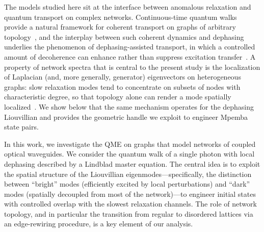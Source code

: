 \documentclass[pdflatex,sn-mathphys-num]{sn-jnl}
\let\origtextcolor\textcolor
\newcommand{\rev}[1]{{\origtextcolor{revred}{#1}}}
\renewcommand{\textcolor}[2]{#2}
\begin{document}
\rev{The models studied here sit at the interface between anomalous relaxation and quantum transport on complex networks. Continuous-time quantum walks provide a natural framework for coherent transport on graphs of arbitrary topology~\cite{Mulken2011}, and the interplay between such coherent dynamics and dephasing underlies the phenomenon of dephasing-assisted transport, in which a controlled amount of decoherence can enhance rather than suppress excitation transfer~\cite{Plenio2008}. A property of network spectra that is central to the present study is the localization of Laplacian (and, more generally, generator) eigenvectors on heterogeneous graphs: slow relaxation modes tend to concentrate on subsets of nodes with characteristic degree, so that topology alone can render a mode spatially localized~\cite{Hata2017}. We show below that the same mechanism operates for the dephasing Liouvillian and provides the geometric handle we exploit to engineer Mpemba state pairs.}

In this work, we investigate the QME on graphs that model networks of coupled optical waveguides. We consider the
quantum walk of a single photon with local dephasing described by a Lindblad master equation. The
central idea is to exploit the spatial structure of the Liouvillian
eigenmodes---specifically, the distinction between ``bright'' modes
(efficiently excited by local perturbations) and ``dark'' modes
(spatially decoupled from most of the network)---to engineer initial
states with controlled overlap with the slowest relaxation channels.
The role of network topology, and in particular the transition from
regular to disordered lattices via an edge-rewiring
procedure, is a key element of our analysis.
\end{document}
